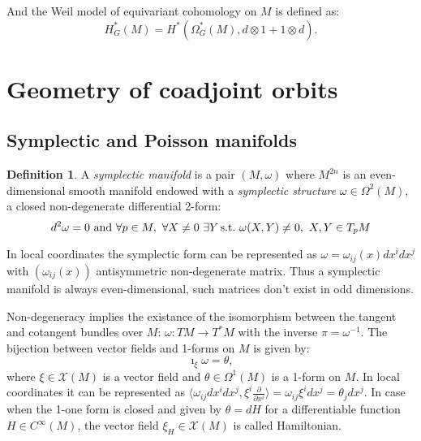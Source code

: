 \documentclass[11pt]{report}
\theoremstyle{plain}
\theoremstyle{definition}
\newtheorem{defn}[thm]{Definition}
\theoremstyle{remark}
\theoremstyle{remark}
\numberwithin{equation}{section}
\begin{document}
And the Weil model of equivariant cohomology on $M$ is defined as:
\begin{equation}
H^*_G(M)  = H^*( \Omega_G ^* (M), d\otimes 1 + 1\otimes d).
\end{equation}


\section{Geometry of coadjoint orbits}

\subsection{Symplectic and Poisson manifolds}

\begin{defn}
 A \textit{symplectic manifold} is a pair $(M,\omega)$ where $M^{2n}$ is an even-dimensional smooth manifold endowed with a \textit{symplectic structure} $\omega \in \Omega^2(M)$, a closed non-degenerate differential 2-form:
 $$ d^2\omega = 0 \, \, {\rm and} \, \, \forall p\in M, \, \, \forall X \ne 0 \, \, \exists Y \, {\rm s. t.} \,\, \omega(X,Y)\ne 0, \, \,  X, Y\in T_pM $$
 \end{defn}
 
 In local coordinates the symplectic form can be represented as $\omega = \omega_{ij}(x) dx^idx^j$ with $(\omega_{ij}(x))$ antisymmetric non-degenerate matrix. Thus a symplectic manifold is always even-dimensional, such matrices don\rq{}t exist in odd dimensions. 
 
 Non-degeneracy implies the existance of the isomorphism between the tangent and cotangent bundles over $M$: $\omega: TM \to T^*M$ with the inverse $\pi = \omega^{-1}$.
 The bijection between vector fields and 1-forms on $M$ is given by:
 \begin{equation}
 \imath_\xi \omega = \theta,
 \end{equation}
 where $\xi\in\mathcal{X}(M)$ is a vector field and $\theta \in\Omega^1(M)$ is a 1-form on $M$.
 In local coordinates it can be represented as $\langle \omega_{ij}dx^idx^j, \xi^i\frac{\partial}{\partial x^i} \rangle = \omega_{ij}\xi^idx^j = \theta_jdx^j$.
 In case when the 1-one form is closed and given by $\theta = dH$ for a differentiable function $H\in C^{\infty}(M)$, the vector field $\xi_H\in\mathcal{X}(M)$ is called Hamiltonian. 
 
\end{document}
